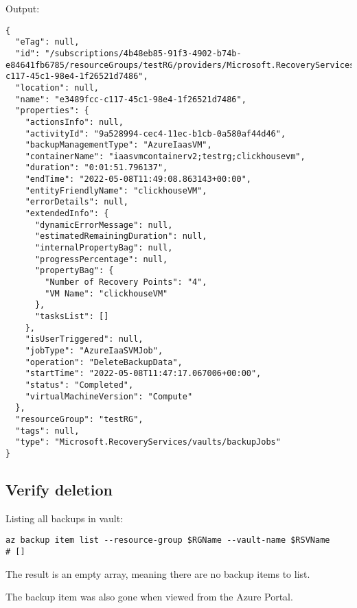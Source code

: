 Output:
\begin{verbatim}
{
  "eTag": null,
  "id": "/subscriptions/4b48eb85-91f3-4902-b74b-e84641fb6785/resourceGroups/testRG/providers/Microsoft.RecoveryServices/vaults/myRSV/backupJobs/e3489fcc-c117-45c1-98e4-1f26521d7486",
  "location": null,
  "name": "e3489fcc-c117-45c1-98e4-1f26521d7486",
  "properties": {
    "actionsInfo": null,
    "activityId": "9a528994-cec4-11ec-b1cb-0a580af44d46",
    "backupManagementType": "AzureIaasVM",
    "containerName": "iaasvmcontainerv2;testrg;clickhousevm",
    "duration": "0:01:51.796137",
    "endTime": "2022-05-08T11:49:08.863143+00:00",
    "entityFriendlyName": "clickhouseVM",
    "errorDetails": null,
    "extendedInfo": {
      "dynamicErrorMessage": null,
      "estimatedRemainingDuration": null,
      "internalPropertyBag": null,
      "progressPercentage": null,
      "propertyBag": {
        "Number of Recovery Points": "4",
        "VM Name": "clickhouseVM"
      },
      "tasksList": []
    },
    "isUserTriggered": null,
    "jobType": "AzureIaaSVMJob",
    "operation": "DeleteBackupData",
    "startTime": "2022-05-08T11:47:17.067006+00:00",
    "status": "Completed",
    "virtualMachineVersion": "Compute"
  },
  "resourceGroup": "testRG",
  "tags": null,
  "type": "Microsoft.RecoveryServices/vaults/backupJobs"
}
\end{verbatim}

\subsection{Verify deletion}
\label{sec:org70d3c0f}
Listing all backups in vault:
\begin{verbatim}
az backup item list --resource-group $RGName --vault-name $RSVName
# []
\end{verbatim}

The result is an empty array, meaning there are no backup items to list.

The backup item was also gone when viewed from the Azure Portal.
